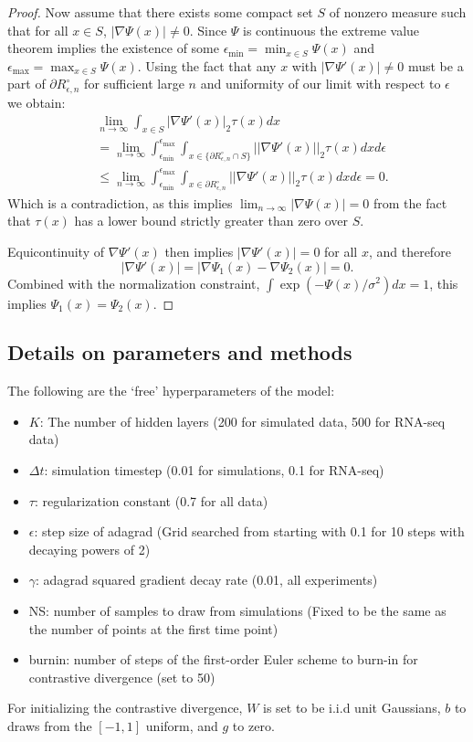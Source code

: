 \documentclass{article}
\begin{document}
\begin{proof}
Now assume that there exists some compact set $S$ of nonzero measure such that for all $x\in S$, $|\nabla \Psi(x)| \neq 0$. Since $\Psi$ is continuous the extreme value theorem implies the existence of some $\epsilon_{\text{min}} = \min_{x\in S}\Psi(x)$ and $\epsilon_{\text{max}}=\max_{x\in S}\Psi(x)$. Using the fact that any $x$ with $|\nabla\Psi'(x)|\neq 0$ must be a part of $\partial R_{\epsilon,n}^\circ$ for sufficient large $n$ and uniformity of our limit with respect to $\epsilon$ we obtain:
\begin{align*}
&\lim_{n\to\infty} \int_{x\in S} |\nabla \Psi'(x)|_2 \tau(x)dx\\
&=\lim_{n\to\infty} \int_{\epsilon_{\text{min}}}^{\epsilon_{\text{max}}} \int_{x\in \{\partial R_{\epsilon,n}^\circ \cap S\}} ||\nabla \Psi'(x)||_2 \tau(x) dx d\epsilon\\
&\leq \lim_{n \to \infty} \int_{\epsilon_{\text{min}}}^{\epsilon_{\text{max}}} \int_{x\in \partial R_{\epsilon,n}^\circ} ||\nabla \Psi'(x)||_2 \tau(x) dx d\epsilon =0.
\end{align*}
Which is a contradiction, as this implies $\lim_{n \to \infty} |\nabla \Psi(x)| =0$ from the fact that $\tau(x)$ has a lower bound strictly greater than zero over $S$.

Equicontinuity of $\nabla\Psi'(x)$ then implies $|\nabla \Psi'(x)|=0$ for all $x$, and  therefore
\[|\nabla \Psi'(x)| = |\nabla \Psi_1(x) - \nabla \Psi_2(x)| = 0.\]
Combined with the normalization constraint, $\int \exp(-\Psi(x)/\sigma^2) dx = 1$, this implies $\Psi_1(x) = \Psi_2(x)$.
\end{proof}

\subsection{Details on parameters and methods} \label{sec:params}
The following are the `free' hyperparameters of the model:
\begin{itemize}
\item $K$: The number of hidden layers (200 for simulated data, 500 for RNA-seq data)
\item $\Delta t$: simulation timestep (0.01 for simulations, 0.1 for RNA-seq)
\item $\tau$: regularization constant (0.7 for all data)
\item $\epsilon$: step size of adagrad (Grid searched from starting with 0.1 for 10 steps with decaying powers of 2)
\item $\gamma$: adagrad squared gradient decay rate (0.01, all experiments)
\item NS: number of samples to draw from simulations (Fixed to be the same as the number of points at the first time point)
\item burnin: number of steps of the first-order Euler scheme to burn-in for contrastive divergence (set to 50)
\end{itemize}
For initializing the contrastive divergence, $W$ is set to be i.i.d unit Gaussians, $b$ to draws from the $[-1,1]$ uniform, and $g$ to zero.
\end{document}
